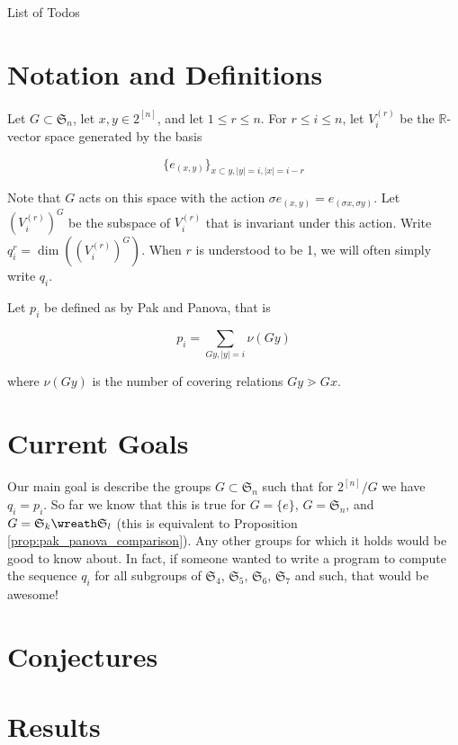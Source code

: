 \documentclass[11pt]{amsart}
\makeatletter
\theoremstyle{definition}
\def\listtodoname{List of Todos}
\def\listoftodos{\@starttoc{tdo}\listtodoname}
\makeatother
\begin{document}
\listoftodos
\newpage


\section{Notation and Definitions}

Let $G\subset \mathfrak{S}_n$, let $x,y\in 2^{[n]}$, and let $1\le r\le n$.  For $r\le i\le n$, let $V_i^{(r)}$ be the $\mathbb{R}$-vector space generated by the basis

$$\{e_{(x,y)}\}_{x\subset y, |y| = i, |x| = i-r}$$

Note that $G$ acts on this space with the action $\sigma e_{(x,y)} = e_{(\sigma x,\sigma y)}$.  Let $\left(V_i^{(r)}\right)^G$ be the subspace of $V_i^{(r)}$ that is invariant under this action.  Write $q_i^r = \dim\left(\left(V_i^{(r)}\right)^G\right)$.  When $r$ is understood to be 1, we will often simply write $q_i$.

Let $p_i$ be defined as by Pak and Panova, that is

$$p_i = \sum_{Gy, |y| = i} \nu(Gy)$$

where $\nu(Gy)$ is the number of covering relations $Gy \gtrdot Gx$.




\section{Current Goals}
Our main goal is describe the groups $G\subset \mathfrak{S}_n$ such that for $2^{[n]}/G$ we have $q_i = p_i$.  So far we know that this is true for $G = \{e\}$, $G = \mathfrak{S}_n$, and $G = \mathfrak{S}_k \wreath \mathfrak{S}_l$ (this is equivalent to Proposition \ref{prop:pak_panova_comparison}).  Any other groups for which it holds would be good to know about.  In fact, if someone wanted to write a program to compute the sequence $q_i$ for all subgroups of $\mathfrak{S}_4$, $\mathfrak{S}_5$, $\mathfrak{S}_6$, $\mathfrak{S}_7$ and such, that would be awesome!




\section{Conjectures}






\section{Results}
\end{document}
